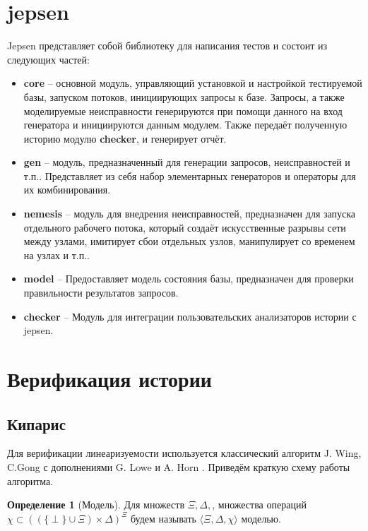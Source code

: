 \documentclass[pdftex,ptm,14pt,a4paper]{extreport}
\theoremstyle{definition}
\newtheorem{definition}{Определение}[chapter]
\begin{document}
\section{jepsen}
Jepsen представляет собой библиотеку для написания тестов и состоит из следующих частей:
\begin{itemize}
    \item \textbf{core} -- основной модуль, управляющий установкой и настройкой тестируемой базы,
        запуском потоков, инициирующих запросы к базе. Запросы, а также моделируемые неисправности
        генерируются при помощи данного на вход  генератора и инициируются данным модулем.
        Также передаёт полученную историю модулю \textbf{checker}, и генерирует отчёт.
    \item \textbf{gen} -- модуль, предназначенный для генерации запросов, неисправностей и т.п..
        Представляет из себя набор элементарных генераторов и операторы для их комбинирования.
    \item \textbf{nemesis} -- модуль для внедрения неисправностей, предназначен для запуска
        отдельного рабочего потока, который создаёт искусственные разрывы сети между узлами,
        имитирует сбои отдельных узлов, манипулирует со временем на узлах и т.п..
    \item \textbf{model} -- Предоставляет модель состояния базы, предназначен для проверки правильности результатов запросов.
    \item \textbf{checker} -- Модуль для интеграции пользовательских анализаторов истории с jepsen.
\end{itemize}

\section{Верификация истории}
\subsection{Кипарис}
\label{cypress-verify}
Для верификации линеаризуемости используется классический алгоритм J. Wing, C.Gong \cite{wing-testing}
с дополнениями G. Lowe \cite{lowe-testing} и A. Horn \cite{horn-faster}.
Приведём краткую схему работы алгоритма.
\begin{definition}[Модель]
    Для множеств $\Xi, \Delta,$, множества операций $\chi \subset ((\{\perp \} \cup \Xi) \times \Delta)^\Xi$
    будем называть $\langle \Xi, \Delta, \chi \rangle$ моделью.
\end{definition}
\end{document}
